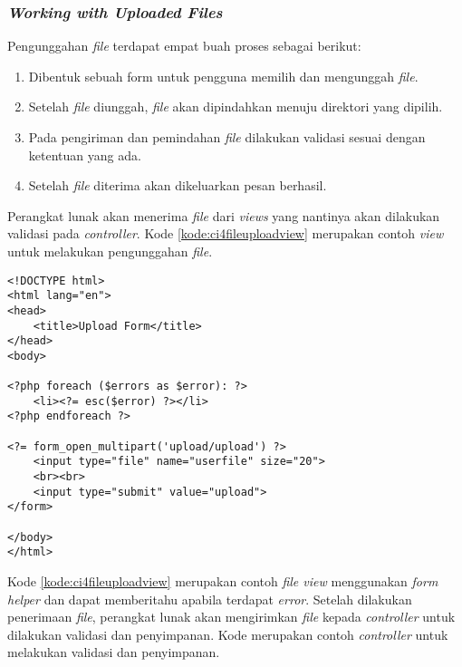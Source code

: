 \subsubsection{\textit{Working with Uploaded Files}}
Pengunggahan \textit{file} terdapat empat buah proses sebagai berikut:
\begin{enumerate}
\item Dibentuk sebuah form untuk pengguna memilih dan mengunggah \textit{file}.
\item Setelah \textit{file} diunggah, \textit{file} akan dipindahkan menuju direktori yang dipilih.
\item Pada pengiriman dan pemindahan \textit{file} dilakukan validasi sesuai dengan ketentuan yang ada.
\item Setelah \textit{file} diterima akan dikeluarkan pesan berhasil.
\end{enumerate}
Perangkat lunak akan menerima \textit{file} dari \textit{views} yang nantinya akan dilakukan validasi pada \textit{controller}. Kode \ref{kode:ci4fileuploadview} merupakan contoh \textit{view} untuk melakukan pengunggahan \textit{file}.
\begin{lstlisting}[caption=Contoh kode untuk melakukan pengunggahan \textit{file}. ,label=kode:ci4fileuploadview]
<!DOCTYPE html>
<html lang="en">
<head>
    <title>Upload Form</title>
</head>
<body>

<?php foreach ($errors as $error): ?>
    <li><?= esc($error) ?></li>
<?php endforeach ?>

<?= form_open_multipart('upload/upload') ?>
    <input type="file" name="userfile" size="20">
    <br><br>
    <input type="submit" value="upload">
</form>

</body>
</html>
\end{lstlisting}
Kode \ref{kode:ci4fileuploadview} merupakan contoh \textit{file view} menggunakan \textit{form helper} dan dapat memberitahu apabila terdapat \textit{error}. Setelah dilakukan penerimaan \textit{file}, perangkat lunak akan mengirimkan \textit{file} kepada \textit{controller} untuk dilakukan validasi dan penyimpanan. Kode merupakan contoh \textit{controller} untuk melakukan validasi dan penyimpanan.
